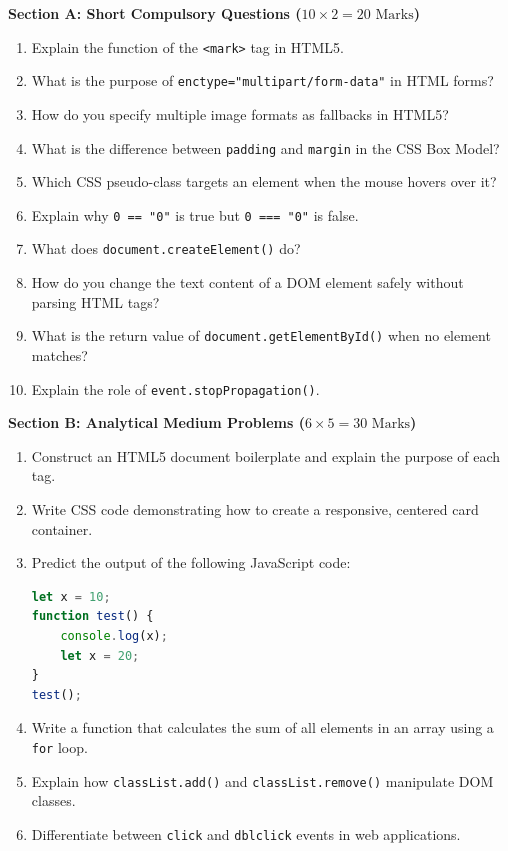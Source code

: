 \begin{mockexam}
\noindent\textbf{Section A: Short Compulsory Questions ($10 \times 2 = 20\text{ Marks}$)}
\begin{enumerate}[leftmargin=1.5em]
    \item Explain the function of the \texttt{<mark>} tag in HTML5.
    \item What is the purpose of \texttt{enctype="multipart/form-data"} in HTML forms?
    \item How do you specify multiple image formats as fallbacks in HTML5?
    \item What is the difference between \texttt{padding} and \texttt{margin} in the CSS Box Model?
    \item Which CSS pseudo-class targets an element when the mouse hovers over it?
    \item Explain why \texttt{0 == "0"} is true but \texttt{0 === "0"} is false.
    \item What does \texttt{document.createElement()} do?
    \item How do you change the text content of a DOM element safely without parsing HTML tags?
    \item What is the return value of \texttt{document.getElementById()} when no element matches?
    \item Explain the role of \texttt{event.stopPropagation()}.
\end{enumerate}

\medskip
\noindent\textbf{Section B: Analytical Medium Problems ($6 \times 5 = 30\text{ Marks}$)}
\begin{enumerate}[leftmargin=1.5em, start=11]
    \item Construct an HTML5 document boilerplate and explain the purpose of each tag.
    \item Write CSS code demonstrating how to create a responsive, centered card container.
    \item Predict the output of the following JavaScript code:
    \begin{lstlisting}[language=JavaScript]
let x = 10;
function test() {
    console.log(x);
    let x = 20;
}
test();
    \end{lstlisting}
    \item Write a function that calculates the sum of all elements in an array using a \texttt{for} loop.
    \item Explain how \texttt{classList.add()} and \texttt{classList.remove()} manipulate DOM classes.
    \item Differentiate between \texttt{click} and \texttt{dblclick} events in web applications.
\end{enumerate}


\end{mockexam}
